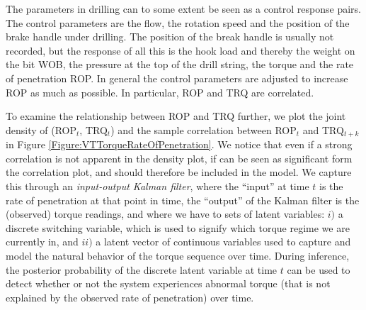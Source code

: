 The parameters in drilling can to some extent be seen as a control response pairs. The control parameters are the flow, the rotation speed and the position of the brake handle under drilling.  The position of the break handle is usually not recorded, but the response of all this is the hook load and thereby the weight on the bit WOB, the pressure at the top of the drill string, the torque and the rate of penetration ROP. In general the control parameters are adjusted to increase ROP as much as possible.  In particular, ROP and TRQ are correlated.

To examine the relationship between ROP and TRQ further, we plot the joint density of (ROP$_t$, TRQ$_t$) and the sample correlation between ROP$_t$ and TRQ$_{t+k}$ in Figure \ref{Figure:VTTorqueRateOfPenetration}. We notice that even if a strong correlation is not apparent in the density plot, if can be seen as significant form the correlation plot, and should therefore be included in the model. We capture this through an \textit{input-output Kalman filter}, where the ``input'' at time $t$ is the rate of penetration at that point in time, the ``output'' of the Kalman filter is the (observed) torque readings, and where we have to sets of latent variables: $i)$ a discrete switching variable, which is used to signify which torque regime we are currently in, and $ii)$ a latent vector of continuous variables used to capture and model the natural behavior of the torque sequence over time. During inference, the posterior probability of the discrete latent variable at time $t$ can be used to detect whether or not the system experiences abnormal torque (that is not explained by the observed rate of penetration) over time. 


